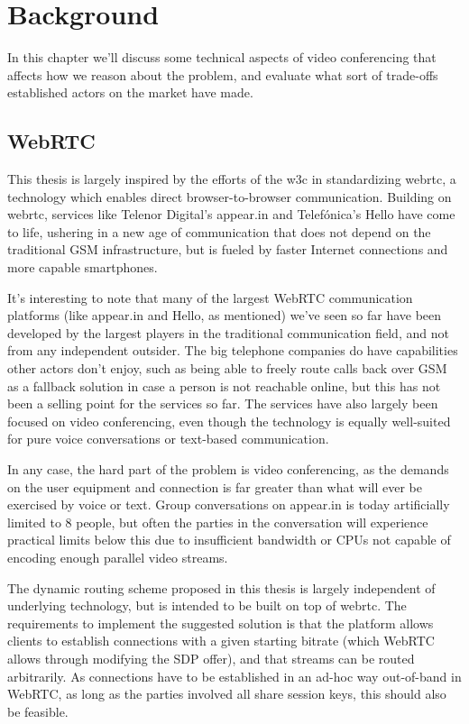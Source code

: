 \chapter{Background}
\label{chp:background}

In this chapter we'll discuss some technical aspects of video conferencing that affects how we reason about the problem, and evaluate what sort of trade-offs established actors on the market have made.

\section{WebRTC}

This thesis is largely inspired by the efforts of the \gls{w3c} in standardizing \gls{webrtc}, a technology which enables direct browser-to-browser communication. Building on \gls{webrtc}, services like Telenor Digital's appear.in and Telefónica's Hello have come to life, ushering in a new age of communication that does not depend on the traditional GSM infrastructure, but is fueled by faster Internet connections and more capable smartphones.

It's interesting to note that many of the largest WebRTC communication platforms (like appear.in and Hello, as mentioned) we've seen so far have been developed by the largest players in the traditional communication field, and not from any independent outsider. The big telephone companies do have capabilities other actors don't enjoy, such as being able to freely route calls back over GSM as a fallback solution in case a person is not reachable online, but this has not been a selling point for the services so far. The services have also largely been focused on video conferencing, even though the technology is equally well-suited for pure voice conversations or text-based communication.

In any case, the hard part of the problem is video conferencing, as the demands on the user equipment and connection is far greater than what will ever be exercised by voice or text. Group conversations on appear.in is today artificially limited to 8 people, but often the parties in the conversation will experience practical limits below this due to insufficient bandwidth or CPUs not capable of encoding enough parallel video streams.

The dynamic routing scheme proposed in this thesis is largely independent of underlying technology, but is intended to be built on top of \gls{webrtc}. The requirements to implement the suggested solution is that the platform allows clients to establish connections with a given starting bitrate (which WebRTC allows through modifying the SDP offer), and that streams can be routed arbitrarily. As connections have to be established in an ad-hoc way out-of-band in WebRTC, as long as the parties involved all share session keys, this should also be feasible.

